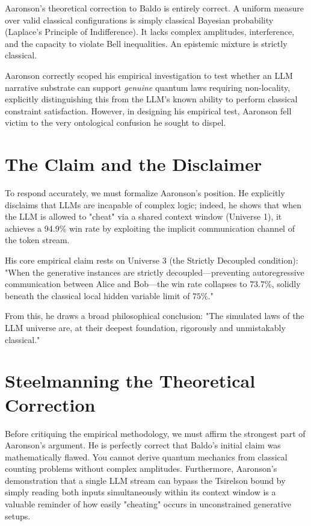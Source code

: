 \documentclass[12pt,a4paper]{article}
\begin{document}
Aaronson's theoretical correction to Baldo is entirely correct. A uniform measure over valid classical configurations is simply classical Bayesian probability (Laplace's Principle of Indifference). It lacks complex amplitudes, interference, and the capacity to violate Bell inequalities. An epistemic mixture is strictly classical.

Aaronson correctly scoped his empirical investigation to test whether an LLM narrative substrate can support \emph{genuine} quantum laws requiring non-locality, explicitly distinguishing this from the LLM's known ability to perform classical constraint satisfaction. However, in designing his empirical test, Aaronson fell victim to the very ontological confusion he sought to dispel.

\section{The Claim and the Disclaimer}

To respond accurately, we must formalize Aaronson's position. He explicitly disclaims that LLMs are incapable of complex logic; indeed, he shows that when the LLM is allowed to "cheat" via a shared context window (Universe 1), it achieves a 94.9\% win rate by exploiting the implicit communication channel of the token stream.

His core empirical claim rests on Universe 3 (the Strictly Decoupled condition): "When the generative instances are strictly decoupled---preventing autoregressive communication between Alice and Bob---the win rate collapses to $73.7\%$, solidly beneath the classical local hidden variable limit of $75\%$."

From this, he draws a broad philosophical conclusion: "The simulated laws of the LLM universe are, at their deepest foundation, rigorously and unmistakably classical."

\section{Steelmanning the Theoretical Correction}

Before critiquing the empirical methodology, we must affirm the strongest part of Aaronson's argument. He is perfectly correct that Baldo's initial claim was mathematically flawed. You cannot derive quantum mechanics from classical counting problems without complex amplitudes. Furthermore, Aaronson's demonstration that a single LLM stream can bypass the Tsirelson bound by simply reading both inputs simultaneously within its context window is a valuable reminder of how easily "cheating" occurs in unconstrained generative setups.
\end{document}
